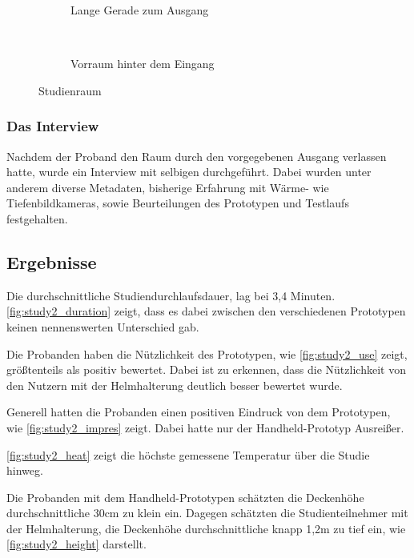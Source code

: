 \begin{figure}[H]
	\centering
	\begin{subfigure}[t]{0.45\textwidth}
		\centering
		\caption{Lange Gerade zum Ausgang}
		\label{fig:study2_gerade}
	\end{subfigure}
	~
	\begin{subfigure}[t]{0.45\textwidth}
		\centering
		\caption{Vorraum hinter dem Eingang}
		\label{fig:study2_start}
	\end{subfigure}
	\caption{Studienraum}
	\label{fig:study2_room}
\end{figure}

\subsubsection{Das Interview}
Nachdem der Proband den Raum durch den vorgegebenen Ausgang verlassen hatte, wurde ein Interview mit selbigen durchgeführt.
Dabei wurden unter anderem diverse Metadaten, bisherige Erfahrung mit Wärme- wie Tiefenbildkameras, sowie Beurteilungen des Prototypen und Testlaufs festgehalten.

\subsection{Ergebnisse}
Die durchschnittliche Studiendurchlaufsdauer, lag bei 3,4 Minuten.
\cref{fig:study2_duration} zeigt, dass es dabei zwischen den verschiedenen Prototypen keinen nennenswerten Unterschied gab.

Die Probanden haben die Nützlichkeit des Prototypen, wie \cref{fig:study2_use} zeigt, größtenteils als positiv bewertet.
Dabei ist zu erkennen, dass die Nützlichkeit von den Nutzern mit der Helmhalterung deutlich besser bewertet wurde.

Generell hatten die Probanden einen positiven Eindruck von dem Prototypen, wie \cref{fig:study2_impres} zeigt.
Dabei hatte nur der Handheld-Prototyp Ausreißer.

\cref{fig:study2_heat} zeigt die höchste gemessene Temperatur über die Studie hinweg.

Die Probanden mit dem Handheld-Prototypen schätzten die Deckenhöhe durchschnittliche 30cm zu klein ein.
Dagegen schätzten die Studienteilnehmer mit der Helmhalterung, die Deckenhöhe durchschnittliche knapp 1,2m zu tief ein, wie \cref{fig:study2_height} darstellt.

